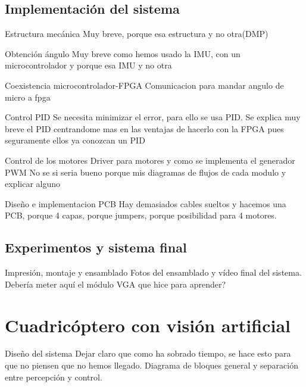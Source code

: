 \documentclass{beamer}
\begin{document}
\subsection{Implementación del sistema}
\begin{frame}{Estructura mecánica}
Muy breve, porque esa estructura y no otra(DMP) 
\end{frame}
\begin{frame}{Obtención ángulo}
Muy breve como hemos usado la IMU, con un microcontrolador y porque esa IMU y no otra
\end{frame}
\begin{frame}{Coexistencia microcontrolador-FPGA}
Comunicacion para mandar angulo de micro a fpga
\end{frame}
\begin{frame}{Control PID}
Se necesita minimizar el error, para ello se usa PID.
Se explica muy breve el PID centrandome mas en las ventajas de hacerlo con la FPGA pues seguramente ellos ya conozcan un PID
\end{frame}
\begin{frame}{Control de los motores}
	Driver para motores y como se implementa el generador PWM
	No se si seria bueno porque mis diagramas de flujos de cada modulo y explicar alguno
\end{frame}
\begin{frame}{Diseño e implementacion PCB}
Hay demasiados cables sueltos y hacemos una PCB, porque 4 capas, porque jumpers, porque posibilidad para 4 motores.
\end{frame}
\subsection{Experimentos y sistema final}
\begin{frame}{Impresión, montaje y ensamblado}
	Fotos del ensamblado y vídeo final del sistema.
	Debería meter aquí el módulo VGA que hice para aprender?	
\end{frame}
\section{Cuadricóptero con visión artificial}
\begin{frame}{Diseño del sistema}
	Dejar claro que como ha sobrado tiempo, se hace esto para que no piensen que no hemos llegado. Diagrama de bloques general y separación entre percepción y control.
\end{frame}
\end{document}

